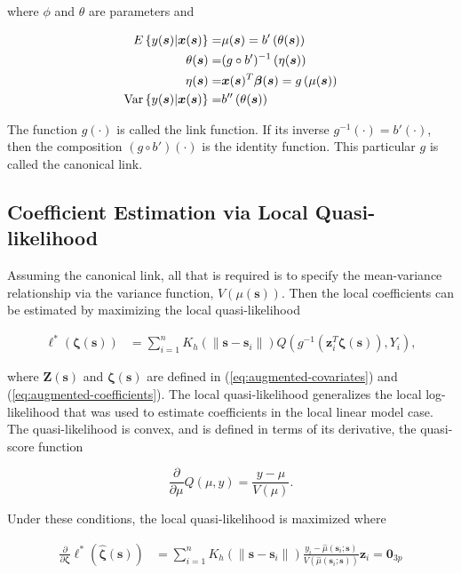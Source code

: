 \documentclass[authoryear,review, 12pt]{elsarticle}
\begin{document}
where $\phi$ and $\theta$ are parameters and

\begin{align*}
E\left\{ y(\bm{s})|\bm{x}(\bm{s})\right\} = & \mu(\bm{s})=b'\left(\theta(\bm{s})\right)\\
\theta(\bm{s})= & (g\circ b')^{-1}\left(\eta(\bm{s})\right)\\
\eta(\bm{s})= & \bm{x}(\bm{s})^{T}\bm{\beta}(\bm{s})=g\left(\mu(\bm{s})\right)\\
\text{\text{Var}}\left\{ y(\bm{s})|\bm{x}(\bm{s})\right\} = & b''\left(\theta(\bm{s})\right)
\end{align*}


The function $g(\cdot)$ is called the link function. If its inverse
$g^{-1}(\cdot)=b'(\cdot)$, then the composition $(g\circ b')(\cdot)$
is the identity function. This particular $g$ is called the canonical
link. 


\subsection{Coefficient Estimation via Local Quasi-likelihood}

Assuming the canonical link, all that is required is to specify the
mean-variance relationship via the variance function, $V\left(\mu(\bm{s})\right)$.
Then the local coefficients can be estimated by maximizing the local
quasi-likelihood 

\begin{align}
\mathcal{\ell}^{*}\left(\bm{\zeta}(\bm{s})\right) & =\sum_{i=1}^{n}K_{h}\left(\|\bm{s}-\bm{s}_{i}\|\right)Q\left(g^{-1}\left(\bm{z}_{i}^{T}\bm{\zeta}(\bm{s})\right),Y_{i}\right),
\end{align}


where $\bm{Z}\left(\bm{s}\right)$ and $\bm{\zeta}\left(\bm{s}\right)$
are defined in (\ref{eq:augmented-covariates}) and (\ref{eq:augmented-coefficients}).
The local quasi-likelihood generalizes the local log-likelihood that
was used to estimate coefficients in the local linear model case.
The quasi-likelihood is convex, and is defined in terms of its derivative,
the quasi-score function

\[
\frac{\partial}{\partial\mu}Q(\mu,y)=\frac{y-\mu}{V(\mu)}.
\]


Under these conditions, the local quasi-likelihood is maximized where

\begin{align}
\frac{\partial}{\partial\bm{\zeta}}\mathcal{\ell}^{*}\left(\hat{\bm{\zeta}}(\bm{s})\right) & =\sum_{i=1}^{n}K_{h}\left(\|\bm{s}-\bm{s}_{i}\|\right)\frac{y_{i}-\hat{\mu}(\bm{s}_{i};\bm{s})}{V\left(\hat{\mu}(\bm{s}_{i};\bm{s})\right)}\bm{z}_{i}=\bm{0}_{3p}
\end{align}
\end{document}
